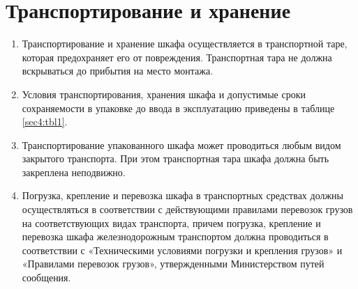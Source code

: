 \color{unidarkgreen}\section[Транспортирование и хранение]{Транспортирование и хранение}\color{black}

\begin{enumerate}[label=\arabic{section}.\arabic*, align=left, labelsep=4pt, leftmargin=0pt, itemindent=2cm]

\item
Транспортирование и хранение шкафа осуществляется в транспортной таре, которая предохраняет его от повреждения.
Транспортная тара не должна вскрываться до прибытия на место монтажа.

\item
Условия транспортирования, хранения шкафа и допустимые сроки сохраняемости в упаковке до ввода в эксплуатацию приведены в таблице \ref{sec4:tbl1}.

\item
Транспортирование упакованного шкафа может проводиться любым видом закрытого транспорта.
При этом транспортная тара шкафа должна быть закреплена неподвижно.

\item
Погрузка, крепление и перевозка шкафа в транспортных средствах должны осуществляться в соответствии с действующими правилами перевозок грузов на соответствующих видах транспорта, причем погрузка, крепление и перевозка шкафа железнодорожным транспортом должна проводиться в соответствии с «Техническими условиями погрузки и крепления грузов» и «Правилами перевозок грузов», утвержденными Министерством путей сообщения.


\end{enumerate}
